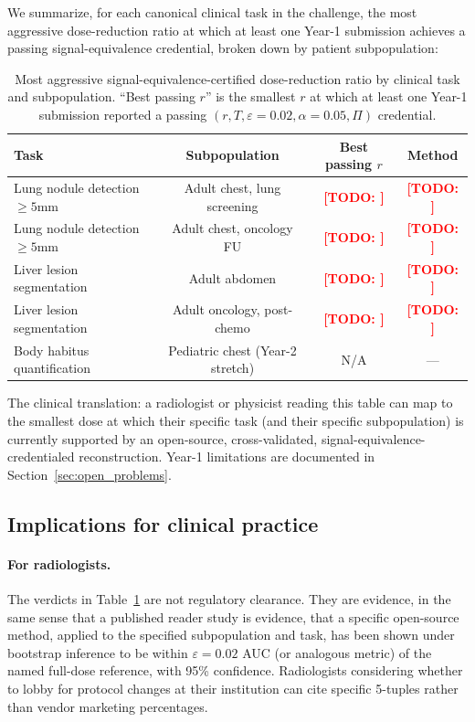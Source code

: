 \documentclass[twoside,11pt]{article}
\newcommand{\todo}[1]{\textcolor{red}{\textbf{[TODO: #1]}}}
\begin{document}
We summarize, for each canonical clinical task in the challenge, the most aggressive dose-reduction ratio at which at least one Year-1 submission achieves a passing signal-equivalence credential, broken down by patient subpopulation:

\begin{table}[h]
    \centering
    \footnotesize
    \begin{tabular}{lccc}
        \toprule
        \textbf{Task} & \textbf{Subpopulation} & \textbf{Best passing $r$} & \textbf{Method} \\
        \midrule
        Lung nodule detection $\geq 5$mm & Adult chest, lung screening   & \todo{}    & \todo{} \\
        Lung nodule detection $\geq 5$mm & Adult chest, oncology FU      & \todo{}    & \todo{} \\
        Liver lesion segmentation        & Adult abdomen                  & \todo{}    & \todo{} \\
        Liver lesion segmentation        & Adult oncology, post-chemo     & \todo{}    & \todo{} \\
        Body habitus quantification      & Pediatric chest (Year-2 stretch) & N/A     & --- \\
        \bottomrule
    \end{tabular}
    \caption{Most aggressive signal-equivalence-certified dose-reduction ratio by clinical task and subpopulation. ``Best passing $r$'' is the smallest $r$ at which at least one Year-1 submission reported a passing $(r, T, \varepsilon=0.02, \alpha=0.05, \Pi)$ credential.}
    \label{tab:clinical_impact_summary}
\end{table}

The clinical translation: a radiologist or physicist reading this table can map to the smallest dose at which their specific task (and their specific subpopulation) is currently supported by an open-source, cross-validated, signal-equivalence-credentialed reconstruction. Year-1 limitations are documented in Section~\ref{sec:open_problems}.

\subsection{Implications for clinical practice}

\paragraph{For radiologists.} The verdicts in Table~\ref{tab:clinical_impact_summary} are not regulatory clearance. They are evidence, in the same sense that a published reader study is evidence, that a specific open-source method, applied to the specified subpopulation and task, has been shown under bootstrap inference to be within $\varepsilon = 0.02$ AUC (or analogous metric) of the named full-dose reference, with 95\% confidence. Radiologists considering whether to lobby for protocol changes at their institution can cite specific 5-tuples rather than vendor marketing percentages.
\end{document}
